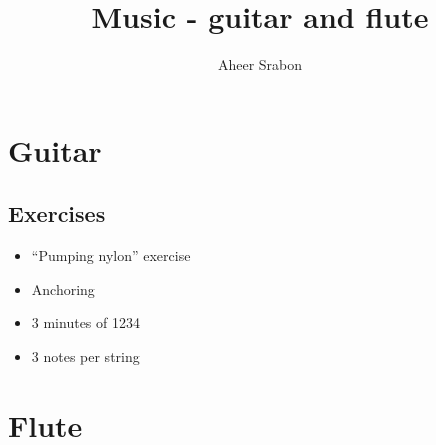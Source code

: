 

\title{Music - guitar and flute}
\author{Aheer Srabon}


\maketitle

\section{Guitar}
\subsection{Exercises}
\begin{itemize}
	\item ``Pumping nylon'' exercise
	\item Anchoring
	\item 3 minutes of 1234
	\item 3 notes per string
\end{itemize}

\section{Flute}


